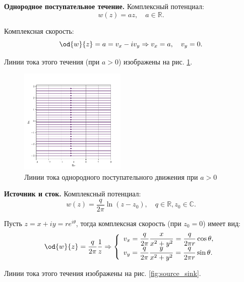 \documentclass[14pt]{extarticle}
\begin{document}
\begin{problems}
\item 
\textbf{Однородное поступательное течение.}
Комплексный потенциал:
\[
	w(z) = a z,\quad
	a \in\mathbb{R}.
\]
		
Комплексная скорость:
\[
	\od{w}{z} = a = v_x - i v_y \Rightarrow
	v_x = a,\quad v_y = 0.
\]

Линии тока этого течения (при $a>0$) изображены на рис. \ref{fig:uniform_translation}.

\begin{figure}
	\centering
	\includegraphics[width=0.45\textwidth]{../img/uniform_translation.pdf}
	\caption{Линии тока однородного поступательного движения при $a>0$}
	\label{fig:uniform_translation}
\end{figure}


\item 
\textbf{Источник и сток.} Комплексный потенциал:
\[
	w(z) = \frac{q}{2\pi}\ln(z-z_0),\quad
	q \in\mathbb{R}, z_0\in\mathbb{C}.
\]
			
Пусть $z=x+iy=re^{i\theta}$, тогда комплексная скорость (при $z_0 = 0$) имеет вид:
\[
\od{w}{z} = \frac{q}{2\pi}\frac{1}{z} \Rightarrow
\left\{
\begin{array}{l}
\displaystyle v_x = \frac{q}{2 \pi}\frac{x}{x^2+y^2} = \frac{q}{2\pi r}\cos\theta,\\
\displaystyle v_y = \frac{q}{2 \pi}\frac{y}{x^2+y^2} = \frac{q}{2\pi r}\sin\theta.
\end{array}
\right.
\]


Линии тока этого течения изображены на рис. \ref{fig:source_sink}.


\end{problems}
\end{document}
